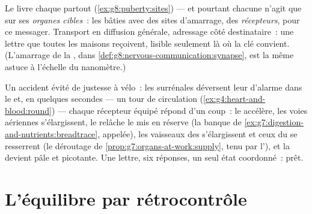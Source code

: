 \begin{proposition}\label{prop:g8:hormonal-communication:address}
Le  livre chaque  partout
(\cref{ex:g8:puberty:sites}) --- et pourtant chacune n'agit
que sur ses \emph{organes cibles}~: les
 bâties avec des sites d'amarrage, des
\emph{récepteurs}, pour ce messager. Transport en diffusion
générale, adressage côté destinataire~: une lettre que
toutes les maisons reçoivent, lisible seulement là où la
clé convient. (L'amarrage de la , dans
\cref{def:g8:nervous-communication:synapse}, est la même
astuce à l'échelle du nanomètre.)
\end{proposition}
\admitted

\begin{example}\label{ex:g8:hormonal-communication:alarm}
Un accident évité de justesse à vélo~: les 
surrénales déversent leur  d'alarme dans le  et,
en quelques secondes --- un tour de circulation
(\cref{ex:g4:heart-and-blood:round}) --- chaque récepteur
équipé répond d'un coup~: le  accélère, les voies
aériennes s'élargissent, le  relâche le  mis en
réserve (la banque de
\cref{ex:g7:digestion-and-nutrients:breadtrace}, appelée),
les vaisseaux des  s'élargissent et ceux du  se resserrent (le déroutage de
\cref{prop:g7:organs-at-work:supply}, tenu par l'),
et la  devient pâle et picotante. Une lettre, six
réponses, un seul état coordonné~: prêt.
\end{example}

\section{L'équilibre par rétrocontrôle}

